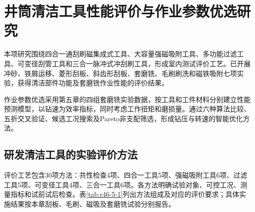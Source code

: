 \chapter{井筒清洁工具性能评价与作业参数优选研究}
\label{chap:r46-5}

本项研究围绕四合一通刮刷磁集成式工具、大容量强磁吸附工具、多功能过滤工具、可变径刮管工具和三合一脉冲式冲刮刷工具，形成室内测试评价工艺。已开展冲砂、铁屑运移、菱形刮板、斜齿形刮板、套磨铣、毛刷刷洗和磁铁吸附七项实验，获得清洁部件功能及套磨铣作业性能的评价结果。

作业参数优选采用第五章的四组套磨铣实验数据，按工具和工件材料分别建立性能预测模型，以钻速为效率指标，同时考虑工作扭矩和磨损量。通过六种算法比较、五折交叉验证、候选工况搜索及Pareto非支配筛选，形成钻压与转速的智能优化方法。

\section{研发清洁工具的实验评价方法}
\label{sec:r46-5.1}
\label{guaban}


评价工艺包含30项方法：共性检查4项、四合一工具5项、强磁吸附工具6项、过滤工具5项、可变径工具4项、三合一工具6项。各方法明确试验对象、可控工况、测量指标和试前试后检查。表\ref{tab:r46-5-1}列出方法组成及对应的评价要求；具体实施结果按本章刮板、毛刷、磁吸及套磨铣试验分别报告。

